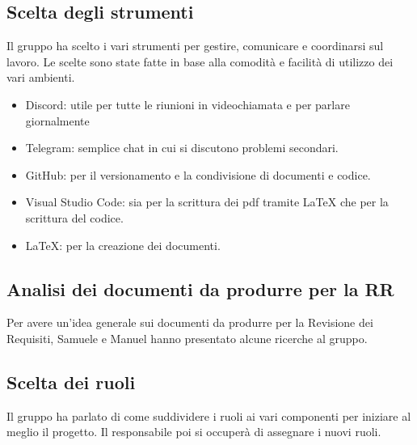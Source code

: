 \documentclass{article}
\begin{document}
        \subsection{Scelta degli strumenti}
        Il gruppo ha scelto i vari strumenti per gestire, comunicare e coordinarsi sul lavoro.
        Le scelte sono state fatte in base alla comodità e facilità di utilizzo dei
        vari ambienti.
        \begin{itemize}
            \item Discord: utile per tutte le riunioni in videochiamata e per parlare giornalmente
            \item Telegram: semplice chat in cui si discutono problemi secondari.
            \item GitHub: per il versionamento e la condivisione di documenti e codice.
            \item Visual Studio Code: sia per la scrittura dei pdf tramite LaTeX che per la scrittura del codice.
            \item LaTeX: per la creazione dei documenti.
        \end{itemize}

        \subsection{Analisi dei documenti da produrre per la RR}
        Per avere un'idea generale sui documenti da produrre per la Revisione dei Requisiti,
        Samuele e Manuel hanno presentato alcune ricerche al gruppo.

        \subsection{Scelta dei ruoli}
        Il gruppo ha parlato di come suddividere i ruoli ai vari componenti per iniziare al meglio il progetto. Il responsabile poi si occuperà di assegnare i nuovi ruoli.
\end{document}
